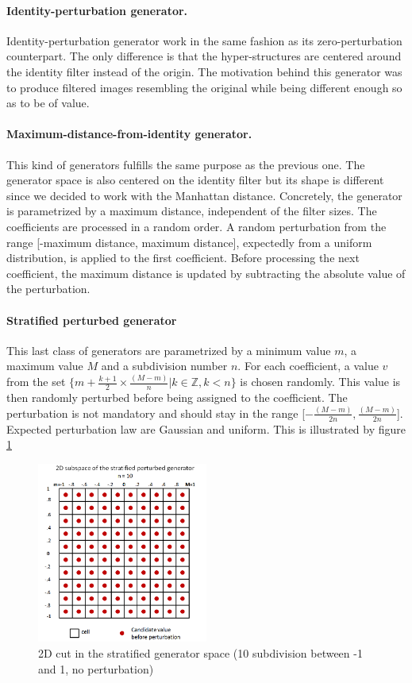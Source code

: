 \documentclass[a4paper]{report}
\begin{document}
			\paragraph{Identity-perturbation generator.}
			Identity-perturbation generator work in the same fashion as its zero-perturbation counterpart. The only difference is that the hyper-structures are centered around the identity filter instead of the origin. 
			The motivation behind this generator was to produce filtered images resembling the original while being different enough so as to be of value.
			\paragraph{Maximum-distance-from-identity generator.} 
			This kind of generators fulfills the same purpose as the previous one. The generator space is also centered on the identity filter but its shape is different since we decided to work with the Manhattan distance. Concretely, the generator is parametrized by a maximum distance, independent of the filter sizes. The coefficients are processed in a random order. A random perturbation from the range [-maximum distance, maximum distance], expectedly from a uniform distribution, is applied to the first coefficient. Before processing the next coefficient, the maximum distance is updated by subtracting the absolute value of the perturbation.
			\paragraph{Stratified perturbed generator}
			This last class of generators are parametrized by a minimum value $m$, a maximum value $M$ and a subdivision number $n$. For each coefficient, a value $v$ from the set $\{m + \frac{k+1}{2} \times \frac{(M-m)}{n} | k \in \mathbb{Z}, k < n\}$ is chosen randomly.  This value is then randomly perturbed before being assigned to the coefficient. The perturbation is not mandatory and should stay in the range [$-\frac{(M-m)}{2n}, \frac{(M-m)}{2n}$]. Expected perturbation law are Gaussian and uniform. This is illustrated by figure \ref{fig:stratgen}
			\begin{figure}
				\centering
					\includegraphics[width=0.5\textwidth]{images/stratgen.png}
				\caption{\label{fig:stratgen}2D cut in the stratified generator space (10 subdivision between -1 and 1, no perturbation)}
			\end{figure}
			
\end{document}
